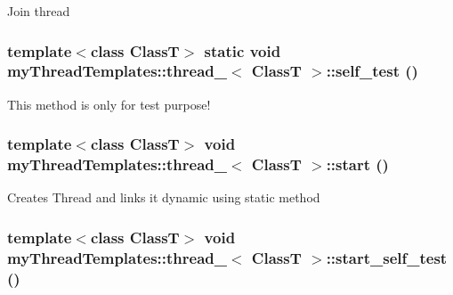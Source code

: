 Join thread 

\hypertarget{classmyThreadTemplates_1_1thread__1_add97f72749590d4023fd23fcd0a3dece}{
\subsubsection[{self\_\-test}]{\setlength{\rightskip}{0pt plus 5cm}template$<$class ClassT$>$ static void {\bf myThreadTemplates::thread\_}$<$ ClassT $>$::self\_\-test ()}}
\label{classmyThreadTemplates_1_1thread__1_add97f72749590d4023fd23fcd0a3dece}


This method is only for test purpose! 

\hypertarget{classmyThreadTemplates_1_1thread__1_a40dcf528dbb18b16ed44054451a575e1}{
\subsubsection[{start}]{\setlength{\rightskip}{0pt plus 5cm}template$<$class ClassT$>$ void {\bf myThreadTemplates::thread\_}$<$ ClassT $>$::start ()}}
\label{classmyThreadTemplates_1_1thread__1_a40dcf528dbb18b16ed44054451a575e1}


Creates Thread and links it dynamic using static method 

\hypertarget{classmyThreadTemplates_1_1thread__1_aaa171242d5355f2a472a566d30863894}{
\subsubsection[{start\_\-self\_\-test}]{\setlength{\rightskip}{0pt plus 5cm}template$<$class ClassT$>$ void {\bf myThreadTemplates::thread\_}$<$ ClassT $>$::start\_\-self\_\-test ()}}
\label{classmyThreadTemplates_1_1thread__1_aaa171242d5355f2a472a566d30863894}


